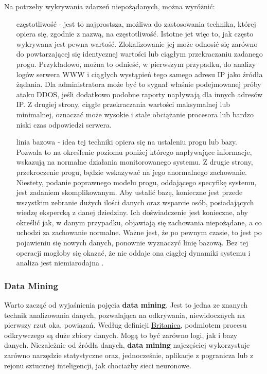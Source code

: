         Na potrzeby wykrywania zdarzeń niepożądanych, można wyróżnić:
        \begin{itemize}
            \item[częstotliwość] - jest to najprostsza, możliwa do zastosowania technika, której opiera się,
            zgodnie z nazwą, na częstotliwość. Istotne jet więc to, jak często wykrywana jest pewna wartość.
            Zlokalizowanie jej może odnosić się zarówno do powtarzającej się identycznej wartości lub ciągłym
            przekraczaniu zadanego progu. Przykładowo, można to odnieść, w pierwszym przypadku,
            do analizy logów serwera WWW i ciągłych wystąpień tego samego adresu IP jako źródła żądania.
            Dla administratora może być to sygnał właśnie podejmowanej próby ataku DDOS, jeśli dodatkowo
            podobne raporty napływają dla innych adresów IP. Z drugiej strony, ciągłe przekraczania wartości
            maksymalnej lub minimalnej, oznaczać może wysokie i stałe obciążanie procesora lub bardzo
            niski czas odpowiedzi serwera. 
            \item[linia bazowa] - idea tej techniki opiera się na ustaleniu progu lub bazy. Pozwala to
            na określenie poziomu poniżej którego napływające informacje, wskazują na normalne działania
            monitorowanego systemu. Z drugie strony, przekroczenie progu, będzie wskazywać na jego
            anormalnego zachowanie. Niestety, podanie poprawnego modelu progu, oddającego
            specyfikę systemu, jest zadaniem skomplikowanym. Aby ustalić bazę, konieczne jest przede wszystkim
            zebranie dużych ilości danych oraz wsparcie osób, posiadających wiedzę ekspercką z danej dziedziny.
            Ich doświadczenie jest konieczne, aby określić jak, w danym przypadku, objawiają się zachowania
            niepożądane, a co uchodzi za zachowanie normalne. Ważne jest, że po pewnym czasie, to jest
            po pojawieniu się nowych danych, ponownie wyznaczyć linię bazową. Bez tej operacji mogłoby się okazać,
            że nie oddaje ona ciągłej dynamiki systemu i analiza jest niemiarodajna \cite{logging_log_management}.
        \end{itemize}
        
        \subsubsection{Data Mining}
        Warto zacząć od wyjaśnienia pojęcia \textbf{data mining}. Jest to jedna ze znanych technik analizowania
        danych, pozwalająca na odkrywania, niewidocznych na pierwszy rzut oka, powiązań. Według definicji
        \href{http://www.britannica.com/technology/data-mining}{Britanica}, podmiotem procesu odkrywczego są
        duże zbiory danych. Mogą to być zarówno logi, jak i bazy danych. Niezależnie od źródła danych, 
        \textbf{data mining} najczęściej wykorzystuje zarówno narzędzie statystyczne oraz, jednocześnie, aplikacje
        z pogranicza lub z rejonu sztucznej inteligencji, jak chociażby sieci neuronowe.
        

